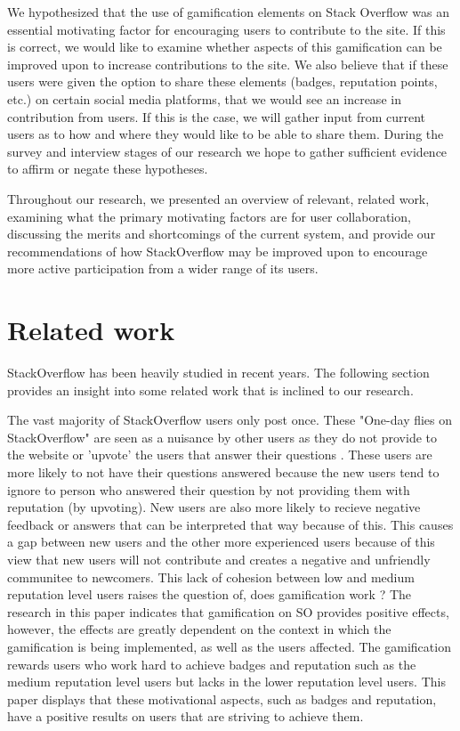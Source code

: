 \documentclass{sigchi}
\begin{document}
We hypothesized that the use of gamification elements on Stack Overflow was an essential motivating factor for encouraging users to contribute to the site. If this is correct, we would like to examine whether aspects of this gamification can be improved upon to increase contributions to the site. We also believe that if these users were given the option to share these elements (badges, reputation points, etc.) on certain social media platforms, that we would see an increase in contribution from users. If this is the case, we will gather input from current users as to how and where they would like to be able to share them. During the survey and interview stages of our research we hope to gather sufficient evidence to affirm or negate these hypotheses.


Throughout our research, we presented an overview of relevant, related work, examining what the primary motivating factors are for user collaboration, discussing the merits and shortcomings of the current system, and provide our recommendations of how StackOverflow may be improved upon to encourage more active participation from a wider range of its users.

\section{Related work}
StackOverflow has been heavily studied in recent years. The following section provides an insight into some related work that is inclined to our research.

The vast majority of StackOverflow users only post once. These "One-day flies on StackOverflow" are seen as a nuisance by other users as they do not provide to the website or 'upvote' the users that answer their questions \cite{Slag}. These users are more likely to not have their questions answered because the new users tend to ignore to person who answered their question by not providing them with reputation (by upvoting). New users are also more likely to recieve negative feedback or answers that can be interpreted that way because of this. This causes a gap between new users and the other more experienced users because of this view that new users will not contribute and creates a negative and unfriendly communitee to newcomers. This lack of cohesion between low and medium reputation level users raises the question of, does gamification work \cite{Hamari}? The research in this paper indicates that gamification on SO provides positive effects, however, the effects are greatly dependent on the context in which the gamification is being implemented, as well as the users affected. The gamification rewards users who work hard to achieve badges and reputation such as the medium reputation level users but lacks in the lower reputation level users. This paper displays that these motivational aspects, such as badges and reputation, have a positive results on users that are striving to achieve them.
\end{document}
